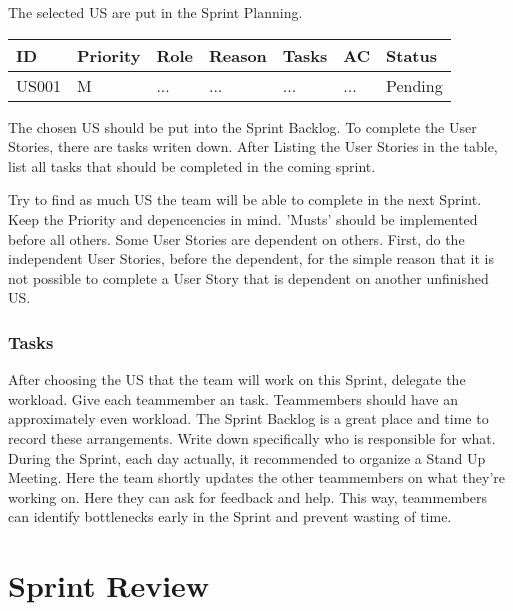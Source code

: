 \documentclass[10pt]{report}
\begin{document}
The selected US are put in the Sprint Planning. 

\medskip
\begin{tabularx}{0.8\textwidth} {
  | >{\raggedright\arraybackslash}X 
  | >{\centering\arraybackslash}X 
  | >{\raggedright\arraybackslash}X 
  | >{\raggedright\arraybackslash}X 
  | >{\raggedright\arraybackslash}X 
  | >{\raggedright\arraybackslash}X 
  | >{\raggedleft\arraybackslash}X | }
 \hline
 ID & Priority & Role & Reason & Tasks & AC & Status \\
 \hline
 US001 & M & ... & ...  & ... & ... & Pending \\
 \hline
\end{tabularx}
\medskip

The chosen US should be put into the Sprint Backlog. To complete the User Stories, there are tasks writen down. After Listing the User Stories in the table, list all tasks that should be completed in the coming sprint. 

Try to find as much US the team will be able to complete in the next Sprint. Keep the Priority and depencencies in mind. 'Musts' should be implemented before all others. Some User Stories are dependent on others. First, do the independent User Stories, before the dependent, for the simple reason that it is not possible to complete a User Story that is dependent on another unfinished US.

\subsubsection{Tasks}

After choosing the US that the team will work on this Sprint, delegate the workload. Give each teammember an task. Teammembers should have an approximately even workload. The Sprint Backlog is a great place and time to record these arrangements. Write down specifically who is responsible for what. During the Sprint, each day actually, it recommended to organize a Stand Up Meeting. Here the team shortly updates the other teammembers on what they're working on. Here they can ask for feedback and help. This way, teammembers can identify bottlenecks early in the Sprint and prevent wasting of time.

\newpage

\section{Sprint Review}
\end{document}
